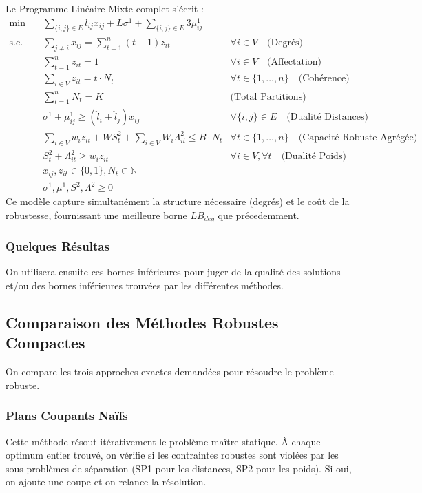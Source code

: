 \documentclass{article}
\begin{document}
Le Programme Linéaire Mixte complet s'écrit :
\begin{align*}
    \min \quad & \sum_{\{i,j\} \in E} l_{ij} x_{ij} + L \sigma^1 + \sum_{\{i,j\} \in E} 3 \mu_{ij}^1 \\
    \text{s.c.} \quad 
    & \sum_{j \neq i} x_{ij} = \sum_{t=1}^n (t-1) z_{it} & \forall i \in V \quad \text{(Degrés)} \\
    & \sum_{t=1}^n z_{it} = 1 & \forall i \in V \quad \text{(Affectation)} \\
    & \sum_{i \in V} z_{it} = t \cdot N_t & \forall t \in \{1,\dots,n\} \quad \text{(Cohérence)} \\
    & \sum_{t=1}^n N_t = K & \text{(Total Partitions)} \\
    & \sigma^1 + \mu_{ij}^1 \ge (\hat{l}_i + \hat{l}_j) x_{ij} & \forall \{i,j\} \in E \quad \text{(Dualité Distances)} \\
    & \sum_{i \in V} w_i z_{it} + W S^2_t + \sum_{i \in V} W_i \Lambda^2_{it} \le B \cdot N_t & \forall t \in \{1,\dots,n\} \quad \text{(Capacité Robuste Agrégée)} \\
    & S^2_t + \Lambda^2_{it} \ge w_i z_{it} & \forall i \in V, \forall t \quad \text{(Dualité Poids)} \\
    & x_{ij}, z_{it} \in \{0,1\}, N_t \in \mathbb{N} \\
    & \sigma^1, \mu^1, S^2, \Lambda^2 \ge 0
\end{align*}
Ce modèle capture simultanément la structure nécessaire (degrés) et le coût de la robustesse, fournissant une meilleure borne $LB_{deg}$ que précedemment.
\subsubsection*{Quelques Résultas}

On utilisera ensuite ces bornes inférieures pour juger de la qualité des solutions et/ou des bornes inférieures trouvées par les différentes méthodes.

\subsection{Comparaison des Méthodes Robustes Compactes}

On compare les trois approches exactes demandées pour résoudre le problème robuste.

\subsubsection{Plans Coupants Naïfs}
Cette méthode résout itérativement le problème maître statique. À chaque optimum entier trouvé, on vérifie si les contraintes robustes sont violées par les sous-problèmes de séparation (SP1 pour les distances, SP2 pour les poids). Si oui, on ajoute une coupe et on relance la résolution.
\newline
\end{document}
